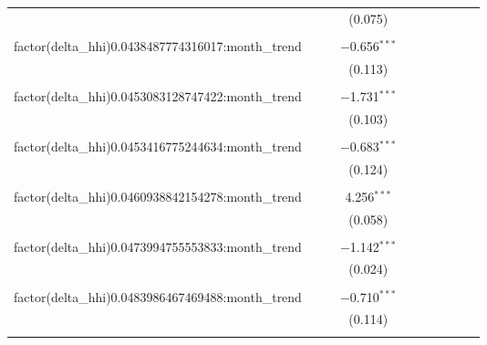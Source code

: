 \begin{table}[H]
{\begin{tabular}{@{\extracolsep{5pt}}lccccccccc}
   &  &  & (0.075) &  &  &  &  &  &  \\  

   & & & & & & & & & \\  

  factor(delta\_hhi)0.0438487774316017:month\_trend &  &  & $-$0.656$^{***}$ &  &  &  &  &  &  \\  

   &  &  & (0.113) &  &  &  &  &  &  \\  

   & & & & & & & & & \\  

  factor(delta\_hhi)0.0453083128747422:month\_trend &  &  & $-$1.731$^{***}$ &  &  &  &  &  &  \\  

   &  &  & (0.103) &  &  &  &  &  &  \\  

   & & & & & & & & & \\  

  factor(delta\_hhi)0.0453416775244634:month\_trend &  &  & $-$0.683$^{***}$ &  &  &  &  &  &  \\  

   &  &  & (0.124) &  &  &  &  &  &  \\  

   & & & & & & & & & \\  

  factor(delta\_hhi)0.0460938842154278:month\_trend &  &  & 4.256$^{***}$ &  &  &  &  &  &  \\  

   &  &  & (0.058) &  &  &  &  &  &  \\  

   & & & & & & & & & \\  

  factor(delta\_hhi)0.0473994755553833:month\_trend &  &  & $-$1.142$^{***}$ &  &  &  &  &  &  \\  

   &  &  & (0.024) &  &  &  &  &  &  \\  

   & & & & & & & & & \\  

  factor(delta\_hhi)0.0483986467469488:month\_trend &  &  & $-$0.710$^{***}$ &  &  &  &  &  &  \\  

   &  &  & (0.114) &  &  &  &  &  &  \\  

   & & & & & & & & & \\  


\end{tabular}}
\end{table}

